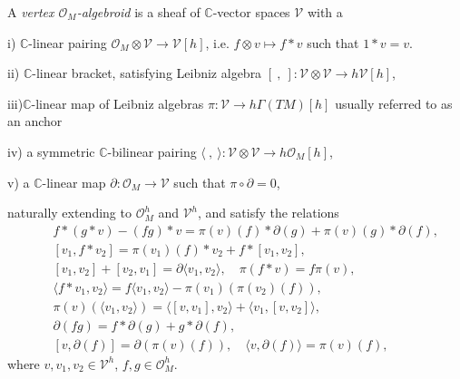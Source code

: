 \documentclass[9pt]{beamer}
\newcommand{\p}{\partial}
\begin{document}
\begin{frame}


A {\em vertex $\mathcal{O}_M$-algebroid} is a sheaf of $\mathbb{C}$-vector 
spaces $\mathcal{V}$ with a\\

\vspace*{1mm}

i) $\mathbb{C}$-linear pairing $\mathcal{O}_M\otimes\mathcal{V}  \to  \mathcal{V}[h]$, i.e.  
$f\otimes v  \mapsto  f*v$ 
such that $1* v = v$.\\

\vspace*{1mm}

ii) $\mathbb{C}$-linear bracket, satisfying  Leibniz algebra 
$[\ ,\ ] :
\mathcal{V}\otimes\mathcal{V}\to h\mathcal{V}[h]$,\\

\vspace*{1mm}

iii)$\mathbb{C}$-linear map of Leibniz algebras $\pi : \mathcal{V}\to h\Gamma({TM})[h]$ usually referred to as an anchor\\ 

\vspace*{1mm}

iv) a symmetric $\mathbb{C}$-bilinear pairing $\langle\ ,\ \rangle :
\mathcal{V}\otimes \mathcal{V}\to h\mathcal{O}_M[h]$,

\vspace*{1mm}

v) a $\mathbb{C}$-linear map $\p : \mathcal{O}_M\to \mathcal{V}$ 
such that
$\pi\circ\partial = 0$,\\

\vspace*{1mm}

naturally extending to $\mathcal{O}^h_M$ and $\mathcal{V}^h$, and satisfy the relations
\begin{eqnarray*}
&& f*(g*v) - (fg)*v  =  \pi(v)(f)*\partial(g) +
\pi(v)(g)*\partial(f),\nonumber\\
&&[v_1,f*v_2]  =  \pi(v_1)(f)*v_2 + f*[v_1,v_2], 
\nonumber\\
&&[v_1,v_2] + [v_2,v_1]  =  \partial\langle v_1,v_2\rangle,
\quad
\pi(f*v) = f\pi(v),  \nonumber\\
&&\langle f*v_1, v_2\rangle  =  f\langle v_1,v_2\rangle -
\pi(v_1)(\pi(v_2)(f)), \nonumber\\
&&\pi(v)(\langle v_1, v_2\rangle)  =  \langle[v,v_1],v_2\rangle +
\langle v_1,[v,v_2]\rangle,\nonumber \\
&&\partial(fg)  =  f*\partial(g) + g*\partial(f), \nonumber\\
&&[v,\partial(f)] =  \partial(\pi(v)(f)), \quad
\langle v,\partial(f)\rangle  =  \pi(v)(f),
\end{eqnarray*}
where $v,v_1,v_2\in\mathcal{V}^h$, $f,g\in\mathcal{O}_M^h$. \\

\end{frame} 
\end{document}
